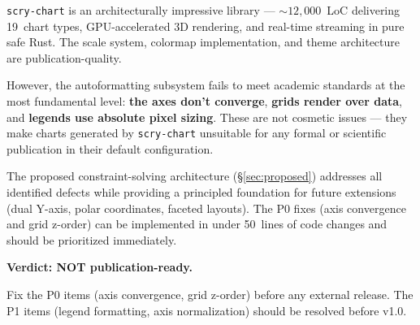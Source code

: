 \documentclass[11pt,a4paper]{article}
\begin{document}
\texttt{scry-chart} is an architecturally impressive library —
${\sim}12{,}000$~LoC delivering 19~chart types, GPU\nobreakdash-accelerated
3D rendering, and real-time streaming in pure safe Rust. The scale system,
colormap implementation, and theme architecture are publication-quality.

However, the autoformatting subsystem fails to meet academic standards at
the most fundamental level: \textbf{the axes don't converge}, \textbf{grids
render over data}, and \textbf{legends use absolute pixel sizing}. These
are not cosmetic issues — they make charts generated by \texttt{scry-chart}
unsuitable for any formal or scientific publication in their default
configuration.

The proposed constraint-solving architecture (§\ref{sec:proposed}) addresses
all identified defects while providing a principled foundation for future
extensions (dual Y-axis, polar coordinates, faceted layouts). The P0 fixes
(axis convergence and grid z-order) can be implemented in under 50~lines of
code changes and should be prioritized immediately.

\begin{center}
\begin{tcolorbox}[colback=criticalred!8,colframe=criticalred,width=12cm]
\textbf{Verdict: NOT publication-ready.}

\medskip
Fix the P0 items (axis convergence, grid z-order) before any
external release. The P1 items (legend formatting, axis normalization)
should be resolved before v1.0.
\end{tcolorbox}
\end{center}
\end{document}
